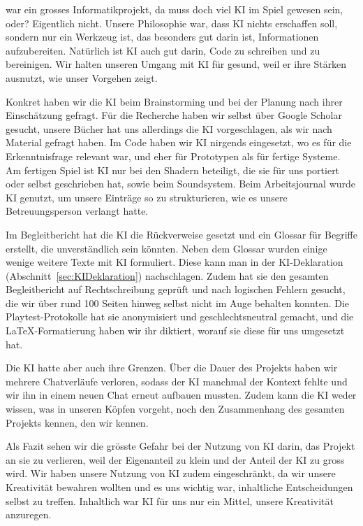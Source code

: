 \documentclass[../Main.tex]{subfiles}
\begin{document}
 war ein grosses Informatikprojekt, da muss doch viel KI im Spiel gewesen sein, oder? Eigentlich nicht. Unsere Philosophie war, dass KI nichts erschaffen soll, sondern nur ein Werkzeug ist, das besonders gut darin ist, Informationen aufzubereiten. Natürlich ist KI auch gut darin, Code zu schreiben und zu bereinigen. Wir halten unseren Umgang mit KI für gesund, weil er ihre Stärken ausnutzt, wie unser Vorgehen zeigt.

Konkret haben wir die KI beim Brainstorming und bei der Planung nach ihrer Einschätzung gefragt. Für die Recherche haben wir selbst über Google Scholar gesucht, unsere Bücher hat uns allerdings die KI vorgeschlagen, als wir nach Material gefragt haben. Im Code haben wir KI nirgends eingesetzt, wo es für die Erkenntnisfrage relevant war, und eher für Prototypen als für fertige Systeme. Am fertigen Spiel ist KI nur bei den Shadern beteiligt, die sie für uns portiert oder selbst geschrieben hat, sowie beim Soundsystem. Beim Arbeitsjournal wurde KI genutzt, um unsere Einträge so zu strukturieren, wie es unsere Betreuungsperson verlangt hatte.

Im Begleitbericht hat die KI die Rückverweise gesetzt und ein Glossar für Begriffe erstellt, die unverständlich sein könnten. Neben dem Glossar wurden einige wenige weitere Texte mit KI formuliert. Diese kann man in der KI-Deklaration (Abschnitt~\ref{sec:KIDeklaration}) nachschlagen. Zudem hat sie den gesamten Begleitbericht auf Rechtschreibung geprüft und nach logischen Fehlern gesucht, die wir über rund 100 Seiten hinweg selbst nicht im Auge behalten konnten. Die Playtest-Protokolle hat sie anonymisiert und geschlechtsneutral gemacht, und die \LaTeX-Formatierung haben wir ihr diktiert, worauf sie diese für uns umgesetzt hat.

Die KI hatte aber auch ihre Grenzen. Über die Dauer des Projekts haben wir mehrere Chatverläufe verloren, sodass der KI manchmal der Kontext fehlte und wir ihn in einem neuen Chat erneut aufbauen mussten. Zudem kann die KI weder wissen, was in unseren Köpfen vorgeht, noch den Zusammenhang des gesamten Projekts kennen, den wir kennen.

Als Fazit sehen wir die grösste Gefahr bei der Nutzung von KI darin, das Projekt an sie zu verlieren, weil der Eigenanteil zu klein und der Anteil der KI zu gross wird. Wir haben unsere Nutzung von KI zudem eingeschränkt, da wir unsere Kreativität bewahren wollten und es uns wichtig war, inhaltliche Entscheidungen selbst zu treffen. Inhaltlich war KI für uns nur ein Mittel, unsere Kreativität anzuregen.
\end{document}

